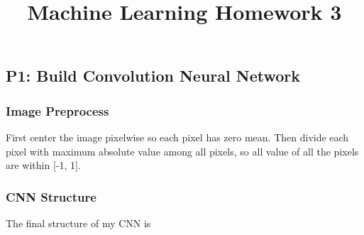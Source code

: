 \documentclass[fleqn,a4paper,12pt]{article}
\title{Machine Learning Homework 3}
\date{}
\begin{document}
\maketitle
\thispagestyle{fancy}

\subsection*{P1: Build Convolution Neural Network}

\subsubsection*{Image Preprocess}

First center the image pixelwise so each pixel has zero mean. Then divide each pixel with maximum absolute value among all pixels, so all value of all the pixels are within [-1, 1].

\subsubsection*{CNN Structure}

The final structure of my CNN is
\end{document}
